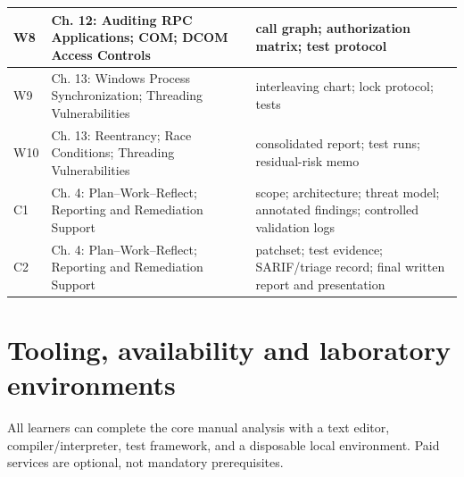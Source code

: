 \documentclass[10pt,letterpaper]{article}
\begin{document}
\begin{longtable}{>{\raggedright\arraybackslash}p{}>{\raggedright\arraybackslash}p{}>{\raggedright\arraybackslash}p{}}
W8 & Ch. 12: Auditing RPC Applications; COM; DCOM Access Controls & call graph; authorization matrix; test protocol\\\midrule
W9 & Ch. 13: Windows Process Synchronization; Threading Vulnerabilities & interleaving chart; lock protocol; tests\\\midrule
W10 & Ch. 13: Reentrancy; Race Conditions; Threading Vulnerabilities & consolidated report; test runs; residual-risk memo\\\midrule
C1 & Ch. 4: Plan--Work--Reflect; Reporting and Remediation Support & scope; architecture; threat model; annotated findings; controlled validation logs\\\midrule
C2 & Ch. 4: Plan--Work--Reflect; Reporting and Remediation Support & patchset; test evidence; SARIF/triage record; final written report and presentation\\\midrule
\bottomrule\end{longtable}\endgroup
\section{Tooling, availability and laboratory environments}
All learners can complete the core manual analysis with a text editor, compiler/interpreter, test framework, and a disposable local environment. Paid services are optional, not mandatory prerequisites.
\end{document}
